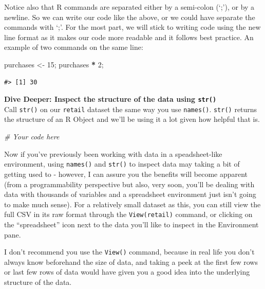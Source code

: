 \documentclass[]{article}
\newenvironment{Shaded}{\begin{snugshade}}{\end{snugshade}}
\newcommand{\CommentTok}[1]{\textcolor[rgb]{0.56,0.35,0.01}{\textit{#1}}}
\newcommand{\DecValTok}[1]{\textcolor[rgb]{0.00,0.00,0.81}{#1}}
\newcommand{\NormalTok}[1]{#1}
\newcommand{\OperatorTok}[1]{\textcolor[rgb]{0.81,0.36,0.00}{\textbf{#1}}}
\newcommand{\StringTok}[1]{\textcolor[rgb]{0.31,0.60,0.02}{#1}}
\begin{document}
Notice also that R commands are separated either by a semi-colon (`;'),
or by a newline. So we can write our code like the above, or we could
have separate the commands with `;'. For the most part, we will stick to
writing code using the new line format as it makes our code more
readable and it follows best practice. An example of two commands on the
same line:

\begin{Shaded}
\begin{Highlighting}[]
\NormalTok{purchases <-}\StringTok{ }\DecValTok{15}\NormalTok{; purchases }\OperatorTok{*}\StringTok{ }\DecValTok{2}\NormalTok{; }
\end{Highlighting}
\end{Shaded}

\begin{verbatim}
#> [1] 30
\end{verbatim}

\textbf{Dive Deeper: Inspect the structure of the data using
\texttt{str()}}\\
Call \texttt{str()} on our \texttt{retail} dataset the same way you use
\texttt{names()}. \texttt{str()} returns the structure of an R Object
and we'll be using it a lot given how helpful that is.

\begin{Shaded}
\begin{Highlighting}[]
\CommentTok{# Your code here}
\end{Highlighting}
\end{Shaded}

Now if you've previously been working with data in a speadsheet-like
environment, using \texttt{names()} and \texttt{str()} to inspect data
may taking a bit of getting used to - however, I can assure you the
benefits will become apparent (from a programmability perspective but
also, very soon, you'll be dealing with data with thousands of variables
and a spreadsheet environment just isn't going to make much sense). For
a relatively small dataset as this, you can still view the full CSV in
its raw format through the \texttt{View(retail)} command, or clicking on
the ``spreadsheet'' icon next to the data you'll like to inspect in the
Environment pane.

I don't recommend you use the \texttt{View()} command, because in real
life you don't always know beforehand the size of data, and taking a
peek at the first few rows or last few rows of data would have given you
a good idea into the underlying structure of the data.
\end{document}
